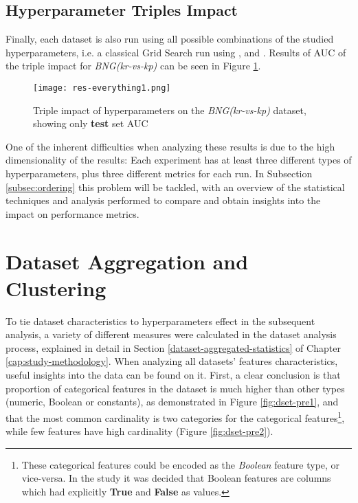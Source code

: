 \subsection{Hyperparameter Triples Impact}
\label{subsec:triple-impact}

Finally, each dataset is also run using all possible combinations of the studied hyperparameters, i.e. a classical Grid Search run using ,  and . Results of AUC of the triple impact for  \textit{BNG(kr-vs-kp)} can be seen in Figure \ref{fig:res-all1}.

\begin{figure}[H]
    \centering
    \texttt{[image: res-everything1.png]} 
    \caption{Triple impact of hyperparameters on the \textit{BNG(kr-vs-kp)} dataset, showing only \textbf{test} set AUC}
    \label{fig:res-all1}
\end{figure}

One of the inherent difficulties when analyzing these results is due to the high dimensionality of the results: Each experiment has at least three different types of hyperparameters, plus three different metrics for each run. In Subsection \ref{subsec:ordering} this problem will be tackled, with an overview of the statistical techniques and analysis performed to compare and obtain insights into the impact on performance metrics.

\section{Dataset Aggregation and Clustering}


To tie dataset characteristics to hyperparameters effect in the subsequent analysis, a variety of different measures were calculated in the dataset analysis process, explained in detail in Section \ref{dataset-aggregated-statistics} of Chapter \ref{cap:study-methodology}. When analyzing all datasets' features characteristics, useful insights into the data can be found on it. First, a clear conclusion is that proportion of categorical features in the dataset is much higher than  other types (numeric, Boolean or constants), as demonstrated in Figure \ref{fig:dset-pre1}, and that the most common cardinality is two categories for the categorical features\footnote{These categorical features could be encoded as the \textit{Boolean} feature type, or vice-versa. In the study it was decided that Boolean features are columns which had explicitly \textbf{True} and \textbf{False} as values.}, while few features have high cardinality (Figure \ref{fig:dset-pre2}).

